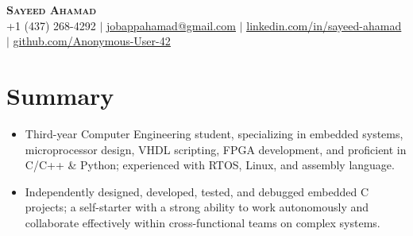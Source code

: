 \documentclass[letterpaper,11pt]{article}
\newcommand{\resumeItem}[1]{
  \item\small{
    {#1 \vspace{-2pt}}
  }
}
\newcommand{\resumeItemListStart}{\begin{itemize}}
\newcommand{\resumeItemListEnd}{\end{itemize}\vspace{-5pt}}
\begin{document}

\begin{center}
    \textbf{\Huge \scshape Sayeed Ahamad} \\ \vspace{1pt}
    \small +1 (437) 268-4292 $|$ \href{mailto:jobappahamad@gmail.com}{\underline{jobappahamad@gmail.com}} $|$ 
    \href{https://linkedin.com/in/sayeed-ahamad}{\underline{linkedin.com/in/sayeed-ahamad}} $|$
    \href{https://github.com/Anonymous-User-42}{\underline{github.com/Anonymous-User-42}}
\end{center}



\section{Summary}
    \resumeItemListStart
        \resumeItem{Third-year Computer Engineering student, specializing in embedded systems, microprocessor design, VHDL scripting, FPGA development, and proficient in C/C++ \& Python; experienced with RTOS, Linux, and assembly language.}
        \resumeItem{Independently designed, developed, tested, and debugged embedded C projects; a self-starter with a strong ability to work autonomously and collaborate effectively within cross-functional teams on complex systems.}
    \resumeItemListEnd
\end{document}

